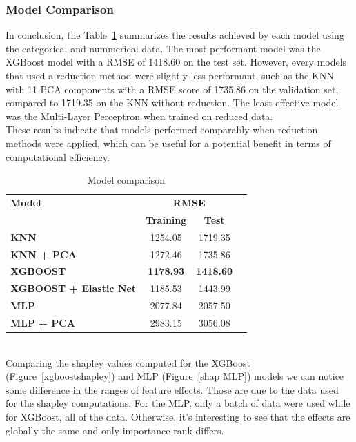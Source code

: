 \documentclass[12pt]{article}
\begin{document}
\FloatBarrier


\newpage
\subsubsection{Model Comparison}

\noindent In conclusion, the Table~\ref{Model_comparison} summarizes the results achieved by each model using the categorical and nummerical data. The most performant model was the XGBoost model with a RMSE of 1418.60 on the test set. However, every models that used a reduction method were slightly less performant, such as the KNN with 11 PCA components with a RMSE score of 1735.86 on the validation set, compared to 1719.35 on the KNN without reduction. The least effective model was the Multi-Layer Perceptron when trained on reduced data.\\
These results indicate that models performed comparably when reduction methods were applied, which can be useful for a potential benefit in terms of computational efficiency.

\FloatBarrier
\begin{table}[h!]
    \centering
    \caption{Model comparison}

    \begin{tabular}{lccc}
        \toprule
        \textbf{Model} & \multicolumn{2}{c}{\textbf{RMSE}} \\
        \cmidrule{2-3}
         & \textbf{Training} & \textbf{Test} \\
        \midrule
        \textbf{KNN} & 1254.05 & 1719.35 \\
        \textbf{KNN + PCA} & 1272.46 & 1735.86 \\
        \textbf{XGBOOST} & \textbf{1178.93} & \textbf{1418.60} \\
        \textbf{XGBOOST + Elastic Net} & 1185.53 & 1443.99 \\
        \textbf{MLP} & 2077.84 & 2057.50 \\
        \textbf{MLP + PCA} & 2983.15 & 3056.08 \\
        \bottomrule
    \end{tabular}
    \label{Model_comparison}
\end{table}
\FloatBarrier
\noindent \\
\noindent Comparing the shapley values computed for the XGBoost (Figure~\ref{xgboostshapley}) and MLP (Figure~\ref{shap MLP}) models we can notice some difference in the ranges of feature effects. Those are due to the data used for the shapley computations. For the MLP, only a batch of data were used while for XGBoost, all of the data. Otherwise, it's interesting to see that the effects are globally the same and only importance rank differs.
\end{document}
